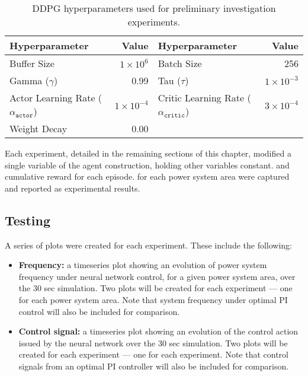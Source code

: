 \begin{table}[h]
	\centering
	\caption{DDPG hyperparameters used for preliminary investigation experiments.}
	\begin{tabular}{lrlr}
	\toprule
	\textbf{Hyperparameter} & \textbf{Value} & \textbf{Hyperparameter} & \textbf{Value} \\
	\midrule
	Buffer Size 	 & $1 \times 10^6$  & Batch Size 	& 256 \\
	Gamma ($\gamma$) & 0.99 	& Tau ($\tau$) 	& $1 \times 10^{-3}$ \\
	Actor Learning Rate ($\alpha_{\texttt{actor}}$) & $1 \times 10^{-4}$ & Critic Learning Rate ($\alpha_{\texttt{critic}}$) & $3 \times 10^{-4} $ \\
	Weight Decay & 0.00 & & \\
	\bottomrule
	\end{tabular}\label{tab:5000_hyperparameters}
\end{table}

Each experiment, detailed in the remaining sections of this chapter, modified a single variable of the agent construction, holding other variables constant. and cumulative reward for each episode. for each power system area were captured and reported as experimental results.




\subsection{Testing}\label{ssec:testing}
A series of plots were created for each experiment. These include the following:
\begin{itemize}
	\item \textbf{Frequency:} a timeseries plot showing an evolution of power system frequency under neural network control, for a given power system area, over the 30 sec simulation. Two plots will be created for each experiment --- one for each power system area. Note that system frequency under optimal PI control will also be included for comparison.
	\item \textbf{Control signal:} a timeseries plot showing an evolution of the control action issued by the neural network over the 30 sec simulation. Two plots will be created for each experiment --- one for each experiment. Note that control signals from an optimal PI controller will also be included for comparison.
\end{itemize}